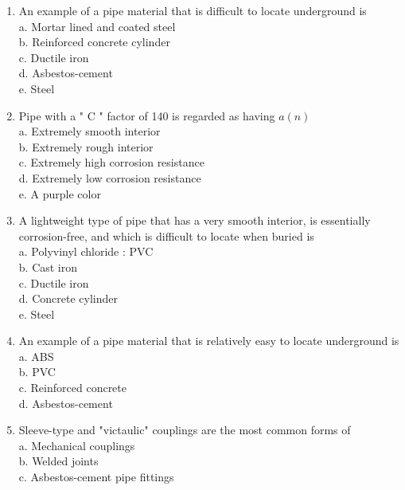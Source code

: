 \documentclass{article}
\begin{document}
\begin{enumerate}[1.]
  \item An example of a pipe material that is difficult to locate underground is\\
a. Mortar lined and coated steel\\
b. Reinforced concrete cylinder\\
c. Ductile iron\\
d. Asbestos-cement\\
e. Steel\\

\item Pipe with a " $\mathrm{C}$ " factor of 140 is regarded as having $a(n)$\\
a. Extremely smooth interior\\
b. Extremely rough interior\\
c. Extremely high corrosion resistance\\
d. Extremely low corrosion resistance\\
e. A purple color\\

  \item A lightweight type of pipe that has a very smooth interior, is essentially corrosion-free, and which is difficult to locate when buried is\\
a. Polyvinyl chloride : PVC\\
b. Cast iron\\
c. Ductile iron\\
d. Concrete cylinder\\
e. Steel\\

  \item An example of a pipe material that is relatively easy to locate underground is\\
a. ABS\\
b. PVC\\
c. Reinforced concrete \\
d. Asbestos-cement\\

\item Sleeve-type and "victaulic" couplings are the most common forms of\\

a. Mechanical couplings\\

b. Welded joints\\

c. Asbestos-cement pipe fittings\\


\end{enumerate}
\end{document}
